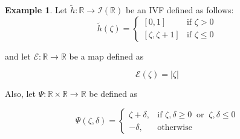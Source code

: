 \documentclass[12pt, reqno]{amsart}
\theoremstyle{definition}
\newtheorem{example}{Example}[section]
\theoremstyle{remark}
\numberwithin{equation}{section}
\begin{document}
      \begin{example} \label{example3.1}
Let $\tilde{h}:\mathbb{R} \rightarrow{\mathcal{I }(\mathbb{R})}$ be an IVF defined as follows:
\[
\tilde{h}(\mathit{\zeta} ) =
\begin{cases} 
    [0,1] & \text{if } \mathit{\zeta}  > 0 \\
     [\mathit{\zeta} , \mathit{\zeta}  + 1] & \text{if } \mathit{\zeta}  \leq 0
\end{cases}
\]

and let \( \mathcal{\mathcal{E}}: \mathbb{R} \to \mathbb{R} \) be a map defined as

\[
\mathcal{\mathcal{E}}(\mathit{\zeta} ) = |\mathit{\zeta} |
\]

Also, let \( \Psi : \mathbb{R} \times \mathbb{R} \to \mathbb{R} \) be defined as

\[
\Psi(\mathit{\zeta} , \mathit{\delta} ) =
\begin{cases}
    \mathit{\zeta}  + \mathit{\delta} , & \text{if } \mathit{\zeta} , \mathit{\delta}  \geq 0 ~\text{ or }~ \mathit{\zeta} , \mathit{\delta}  \leq 0 \\
    -\mathit{\delta} , & \text{otherwise}
\end{cases}
\]


\end{example}
\end{document}
